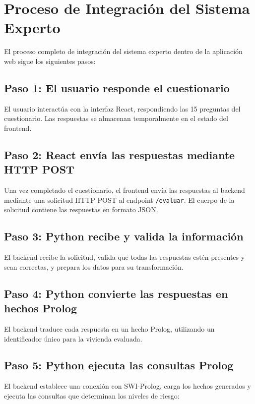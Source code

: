 \documentclass[12pt, letterpaper]{article}
\begin{document}
\section{Proceso de Integración del Sistema Experto}

El proceso completo de integración del sistema experto dentro de la aplicación web sigue los siguientes pasos:

\subsection{Paso 1: El usuario responde el cuestionario}

El usuario interactúa con la interfaz React, respondiendo las 15 preguntas del cuestionario. Las respuestas se almacenan temporalmente en el estado del frontend.

\subsection{Paso 2: React envía las respuestas mediante HTTP POST}

Una vez completado el cuestionario, el frontend envía las respuestas al backend mediante una solicitud HTTP POST al endpoint \texttt{/evaluar}. El cuerpo de la solicitud contiene las respuestas en formato JSON.

\subsection{Paso 3: Python recibe y valida la información}

El backend recibe la solicitud, valida que todas las respuestas estén presentes y sean correctas, y prepara los datos para su transformación.

\subsection{Paso 4: Python convierte las respuestas en hechos Prolog}

El backend traduce cada respuesta en un hecho Prolog, utilizando un identificador único para la vivienda evaluada.

\subsection{Paso 5: Python ejecuta las consultas Prolog}

El backend establece una conexión con SWI-Prolog, carga los hechos generados y ejecuta las consultas que determinan los niveles de riesgo:
\end{document}
